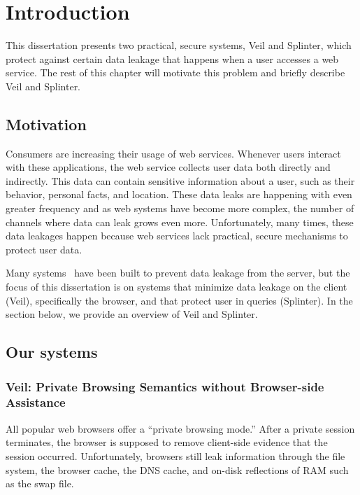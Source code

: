 \section{Introduction}
\label{chap:intro}

This dissertation presents two practical, secure
systems, Veil and Splinter, which protect against
certain data leakage that happens when a user
accesses a web service. The rest of this
chapter will motivate this problem and 
briefly describe Veil and Splinter.

\subsection{Motivation}
Consumers are increasing their usage of web services. Whenever
users interact with these applications, the web service collects
user data both directly and indirectly. This data can contain sensitive 
information about a user, such as their behavior, personal facts,
and location. These data leaks are happening with even greater
frequency and as web systems have become more complex, the number
of channels where data can leak grows even more. Unfortunately,
many times, these data leakages happen because web services
lack practical, secure mechanisms to protect user data. 

Many systems~\cite{mylar, cryptdb, opaque} 
have been built to prevent
data leakage from the server, but
the focus of this dissertation is on systems
that minimize data leakage on the client (Veil), specifically
the browser, and that protect user in queries (Splinter).
In the section below, we provide an overview of Veil and Splinter.

\subsection{Our systems}

\subsubsection{Veil: Private Browsing Semantics without Browser-side Assistance}
All popular web browsers offer a ``private browsing
mode.'' After a private session terminates, the
browser is supposed to remove client-side
evidence that the session occurred. Unfortunately,
browsers still leak information through the file
system, the browser cache, the DNS cache, and
on-disk reflections of RAM such as the swap file.

